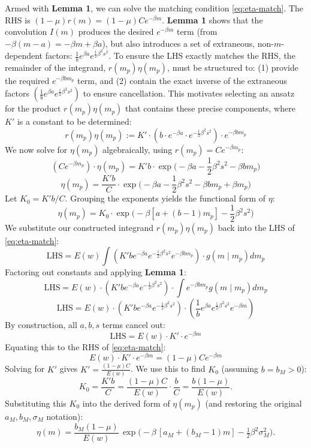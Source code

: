 \documentclass[linenum,doublespace,onecolumn]{SSA-SRL}
\theoremstyle{lemma}
\begin{document}
Armed with \textbf{Lemma 1}, we can solve the matching condition \eqref{eq:eta-match}. The RHS is $(1-\mu)r(m) = (1-\mu)C e^{-\beta m}$. \textbf{Lemma 1} shows that the convolution $I(m)$ produces the desired $e^{-\beta m}$ term (from $-\beta(m-a) = -\beta m + \beta a$), but also introduces a set of extraneous, non-$m$-dependent factors: $\frac{1}{b} e^{\beta a} e^{\frac{1}{2}\beta^2 s^2}$. To ensure the LHS exactly matches the RHS, the remainder of the integrand, $r(m_p)\eta(m_p)$, must be structured to: (1) provide the required $e^{-\beta b m_p}$ term, and (2) contain the exact inverse of the extraneous factors $\left(\frac{1}{b} e^{\beta a} e^{\frac{1}{2}\beta^2 s^2}\right)$ to ensure cancellation.
This motivates selecting an ansatz for the product $r(m_p)\eta(m_p)$ that contains these precise components, where $K'$ is a constant to be determined:
\[
r(m_p)\eta(m_p) := K' \cdot \left( b \cdot e^{-\beta a} \cdot e^{-\frac{1}{2}\beta^2 s^2} \right) \cdot e^{-\beta b m_p}
\]
We now solve for $\eta(m_p)$ algebraically, using $r(m_p) = C e^{-\beta m_p}$:
\[
(C e^{-\beta m_p}) \cdot \eta(m_p) = K' b \cdot \exp\!\Big(-\beta a - \frac{1}{2}\beta^2 s^2 - \beta b m_p \Big)
\]
\[
\eta(m_p) = \frac{K' b}{C} \cdot \exp\!\Big(-\beta a - \frac{1}{2}\beta^2 s^2 - \beta b m_p + \beta m_p \Big)
\]
Let $K_0 = K' b / C$. Grouping the exponents yields the functional form of $\eta$:
\[
\eta(m_p) = K_0 \cdot \exp\!\Big( -\beta[a + (b - 1)m_p] - \frac{1}{2}\beta^2 s^2 \Big)
\]
We substitute our constructed integrand $r(m_p)\eta(m_p)$ back into the LHS of \eqref{eq:eta-match}:
\[
\text{LHS} = E(w) \int \left( K' b e^{-\beta a} e^{-\frac{1}{2}\beta^2 s^2} e^{-\beta b m_p} \right) \cdot g(m\mid m_p) dm_p
\]
Factoring out constants and applying \textbf{Lemma 1}:
\[
\text{LHS} = E(w) \cdot \left( K' b e^{-\beta a} e^{-\frac{1}{2}\beta^2 s^2} \right) \cdot \int e^{-\beta b m_p} g(m\mid m_p) dm_p
\]
\[
\text{LHS} = E(w) \cdot \left( K' b e^{-\beta a} e^{-\frac{1}{2}\beta^2 s^2} \right) \cdot \left( \frac{1}{b} e^{\beta a} e^{\frac{1}{2}\beta^2 s^2} e^{-\beta m} \right)
\]
By construction, all $a, b, s$ terms cancel out:
\[
\text{LHS} = E(w) \cdot K' \cdot e^{-\beta m}
\]
Equating this to the RHS of \eqref{eq:eta-match}:
\[
E(w) \cdot K' \cdot e^{-\beta m} = (1-\mu) C e^{-\beta m}
\]
Solving for $K'$ gives $K' = \frac{(1-\mu)C}{E(w)}$. We use this to find $K_0$ (assuming $b=b_M > 0$):
\[
K_0 = \frac{K' b}{C} = \frac{(1-\mu)C}{E(w)} \cdot \frac{b}{C} = \frac{b(1-\mu)}{E(w)}.
\]
Substituting this \(K_0\) into the derived form of \(\eta(m_p)\) (and restoring the original \(a_M, b_M, \sigma_M\) notation):
\begin{equation}\label{eq:eta-final}
\boxed{\quad
\eta(m)=\frac{b_M(1-\mu)}{E(w)}\,
\exp\!\Big(-\beta\,[a_M+(b_M-1)m]-\tfrac{1}{2}\beta^2\sigma_M^2\Big).\quad}
\end{equation}
\end{document}
